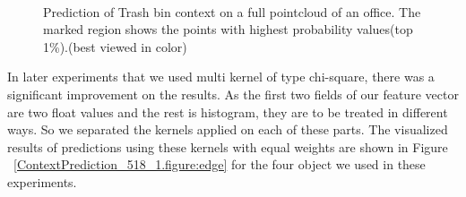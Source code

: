 \begin{figure} [htp]
   \begin{center}
     \\
  \end{center}
  \caption[Prediction of Trash bin model.]
  {Prediction of Trash bin context on a full pointcloud of an office. The marked region shows the points with highest probability values(top 1\%).(best viewed in color)}
  \label{TrashPrediction.figure:edge}
\end{figure}

In later experiments that we used multi kernel of type chi-square, there was a significant improvement on the results.
As the first two fields of our feature vector are two float values and the rest is histogram, they are to be treated 
in different ways.
So we separated the kernels applied on each of these parts.
The visualized results of predictions using these kernels with equal weights are shown in Figure ~\ref{ContextPrediction_518_1.figure:edge} 
for the four object we used in these experiments.

